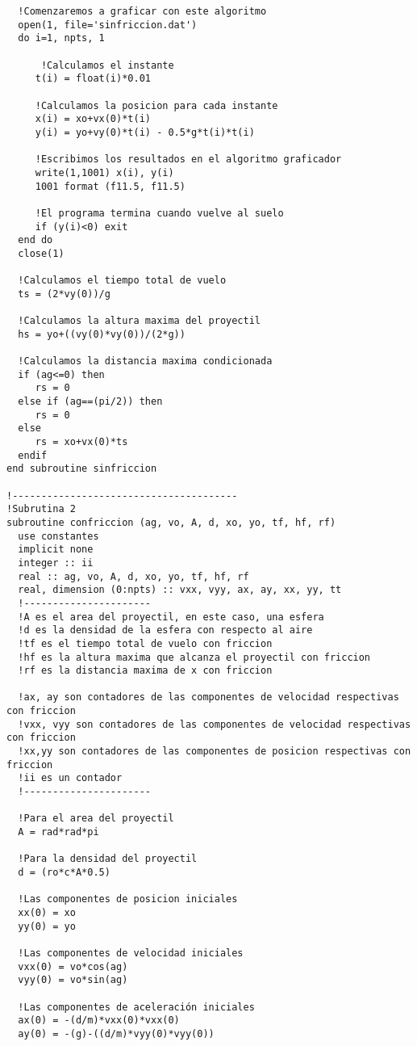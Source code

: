 \documentclass[a4paper]{article}
\begin{document}
\begin{verbatim}
  !Comenzaremos a graficar con este algoritmo   
  open(1, file='sinfriccion.dat')   
  do i=1, npts, 1

      !Calculamos el instante
     t(i) = float(i)*0.01 
     
     !Calculamos la posicion para cada instante     
     x(i) = xo+vx(0)*t(i)   
     y(i) = yo+vy(0)*t(i) - 0.5*g*t(i)*t(i)   

     !Escribimos los resultados en el algoritmo graficador   
     write(1,1001) x(i), y(i)
     1001 format (f11.5, f11.5)

     !El programa termina cuando vuelve al suelo   
     if (y(i)<0) exit   
  end do
  close(1)

  !Calculamos el tiempo total de vuelo
  ts = (2*vy(0))/g

  !Calculamos la altura maxima del proyectil
  hs = yo+((vy(0)*vy(0))/(2*g))

  !Calculamos la distancia maxima condicionada
  if (ag<=0) then
     rs = 0
  else if (ag==(pi/2)) then
     rs = 0
  else
     rs = xo+vx(0)*ts
  endif
end subroutine sinfriccion
    
!---------------------------------------
!Subrutina 2
subroutine confriccion (ag, vo, A, d, xo, yo, tf, hf, rf)    
  use constantes
  implicit none
  integer :: ii
  real :: ag, vo, A, d, xo, yo, tf, hf, rf
  real, dimension (0:npts) :: vxx, vyy, ax, ay, xx, yy, tt
  !----------------------
  !A es el area del proyectil, en este caso, una esfera
  !d es la densidad de la esfera con respecto al aire
  !tf es el tiempo total de vuelo con friccion
  !hf es la altura maxima que alcanza el proyectil con friccion  
  !rf es la distancia maxima de x con friccion
  
  !ax, ay son contadores de las componentes de velocidad respectivas con friccion
  !vxx, vyy son contadores de las componentes de velocidad respectivas con friccion  
  !xx,yy son contadores de las componentes de posicion respectivas con friccion
  !ii es un contador
  !----------------------

  !Para el area del proyectil
  A = rad*rad*pi
  
  !Para la densidad del proyectil
  d = (ro*c*A*0.5)

  !Las componentes de posicion iniciales
  xx(0) = xo
  yy(0) = yo

  !Las componentes de velocidad iniciales
  vxx(0) = vo*cos(ag)
  vyy(0) = vo*sin(ag)
  
  !Las componentes de aceleración iniciales
  ax(0) = -(d/m)*vxx(0)*vxx(0)
  ay(0) = -(g)-((d/m)*vyy(0)*vyy(0))


\end{verbatim}
\end{document}
